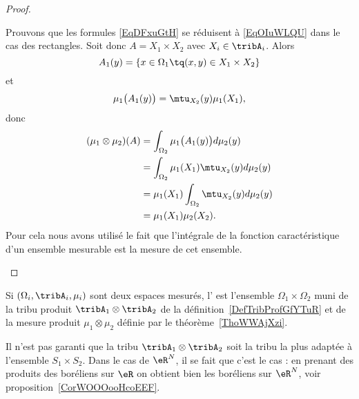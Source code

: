\begin{proof}
\begin{subproof}
		Prouvons que les formules \eqref{EqDFxuGtH} se réduisent à \eqref{EqOIuWLQU} dans le cas des rectangles. Soit donc \( A=X_1\times X_2\) avec \( X_i\in\tribA_i\). Alors
		\begin{equation}
			A_1(y)=\{ x\in\Omega_1\tq (x,y)\in X_1\times X_2 \}
		\end{equation}
		et
		\begin{equation}
			\mu_1\big( A_1(y) \big)=\mtu_{X_2}(y)\mu_1(X_1),
		\end{equation}
		donc
		\begin{subequations}
			\begin{align}
				(\mu_1\otimes\mu_2)(A) & =\int_{\Omega_2}\mu_1\big( A_1(y) \big)d\mu_2(y) \\
				                       & =\int_{\Omega_2}\mu_1(X_1)\mtu_{X_2}(y)d\mu_2(y) \\
				                       & =\mu_1(X_1)\int_{\Omega_2}\mtu_{X_2}(y)d\mu_2(y) \\
				                       & =\mu_1(X_1)\mu_2(X_2).
			\end{align}
		\end{subequations}
		Pour cela nous avons utilisé le fait que l'intégrale de la fonction caractéristique d'un ensemble mesurable est la mesure de cet ensemble.
	\end{subproof}
\end{proof}

\begin{definition}  \label{DefUMlBCAO}
	Si \( (\Omega_i,\tribA_i,\mu_i)\) sont deux espaces mesurés, l' est l'ensemble \( \Omega_1\times \Omega_2\) muni de la tribu produit \( \tribA_1\otimes \tribA_2\) de la définition~\ref{DefTribProfGfYTuR} et de la mesure produit \( \mu_1\otimes \mu_2\) définie par le théorème~\ref{ThoWWAjXzi}.
\end{definition}

\begin{remark}
	Il n'est pas garanti que la tribu \( \tribA_1\otimes\tribA_2\) soit la tribu la plus adaptée à l'ensemble \( S_1\times S_2\). Dans le cas de \( \eR^N\), il se fait que c'est le cas : en prenant des produits des boréliens sur \( \eR\) on obtient bien les boréliens sur \( \eR^N\), voir proposition~\ref{CorWOOOooHcoEEF}.
\end{remark}


